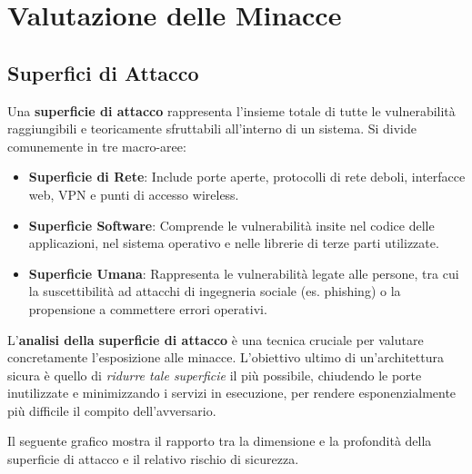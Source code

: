 \section{Valutazione delle Minacce}

\subsection{Superfici di Attacco}
Una \textbf{superficie di attacco} rappresenta l'insieme totale di tutte le vulnerabilità raggiungibili e teoricamente sfruttabili all'interno di un sistema. Si divide comunemente in tre macro-aree:
\begin{itemize}
    \item \textbf{Superficie di Rete}: Include porte aperte, protocolli di rete deboli, interfacce web, VPN e punti di accesso wireless.
    \item \textbf{Superficie Software}: Comprende le vulnerabilità insite nel codice delle applicazioni, nel sistema operativo e nelle librerie di terze parti utilizzate.
    \item \textbf{Superficie Umana}: Rappresenta le vulnerabilità legate alle persone, tra cui la suscettibilità ad attacchi di ingegneria sociale (es. phishing) o la propensione a commettere errori operativi.
\end{itemize}

\begin{notebox}
L'\textbf{analisi della superficie di attacco} è una tecnica cruciale per valutare concretamente l'esposizione alle minacce. L'obiettivo ultimo di un'architettura sicura è quello di \textit{ridurre tale superficie} il più possibile, chiudendo le porte inutilizzate e minimizzando i servizi in esecuzione, per rendere esponenzialmente più difficile il compito dell'avversario.
\end{notebox}

Il seguente grafico mostra il rapporto tra la dimensione e la profondità della superficie di attacco e il relativo rischio di sicurezza.

